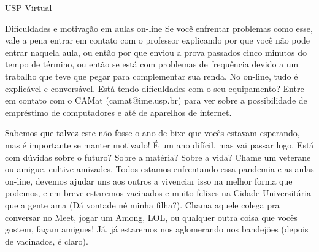 \begin{secao}{USP Virtual}
\begin{subsecao}{Dificuldades e motivação em aulas on-line}
Se você enfrentar problemas como esse, vale a pena entrar em contato com
o professor explicando por que você não pode entrar naquela aula, ou então
por que enviou a prova passados cinco minutos do tempo de término, ou então se
está com problemas de frequência devido a um trabalho que teve que pegar para
complementar sua renda. No on-line, tudo é explicável e conversável. Está tendo dificuldades
com o seu equipamento? Entre em contato com o CAMat (camat@ime.usp.br) para ver
sobre a possibilidade de empréstimo de computadores e até de aparelhos de internet.

Sabemos que talvez este não fosse o ano de bixe que vocês estavam esperando, mas é
importante se manter motivado! É um ano difícil, mas vai passar logo. Está com dúvidas
sobre o futuro? Sobre a matéria? Sobre a vida? Chame um veterane ou amigue, cultive amizades.
Todos estamos enfrentando essa pandemia e as aulas on-line, devemos ajudar uns aos outros
a vivenciar isso na melhor forma que podemos, e em breve estaremos vacinados
 e muito felizes na Cidade Universitária que a gente ama
(Dá vontade né minha filha?). Chama aquele colega pra conversar no Meet, jogar um Among,
LOL, ou qualquer outra coisa que vocês gostem, façam amigues! Já, já estaremos nos aglomerando
nos bandejões (depois de vacinados, é claro).

\end{subsecao}

\end{secao}
